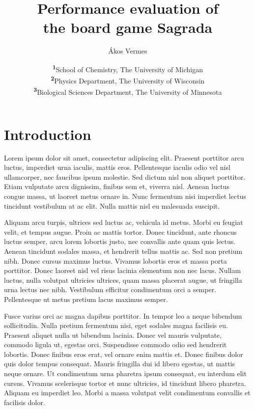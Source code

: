 \documentclass[
	a4paper, %
	10pt, %
	unnumberedsections, %
	twoside, %
]{LTJournalArticle}
\title{Performance evaluation of \\the board game Sagrada} %
\author{%
	Ákos Vermes
}
\date{\footnotesize\textsuperscript{\textbf{1}}School of Chemistry, The University of Michigan\\ \textsuperscript{\textbf{2}}Physics Department, The University of Wisconsin\\ \textsuperscript{\textbf{3}}Biological Sciences Department, The University of Minnesota}
\begin{document}
\maketitle %


\section{Introduction}

Lorem ipsum dolor sit amet, consectetur adipiscing elit. Praesent porttitor arcu luctus, imperdiet urna iaculis, mattis eros. Pellentesque iaculis odio vel nisl ullamcorper, nec faucibus ipsum molestie. Sed dictum nisl non aliquet porttitor. Etiam vulputate arcu dignissim, finibus sem et, viverra nisl. Aenean luctus congue massa, ut laoreet metus ornare in. Nunc fermentum nisi imperdiet lectus tincidunt vestibulum at ac elit. Nulla mattis nisl eu malesuada suscipit.

Aliquam arcu turpis, ultrices sed luctus ac, vehicula id metus. Morbi eu feugiat velit, et tempus augue. Proin ac mattis tortor. Donec tincidunt, ante rhoncus luctus semper, arcu lorem lobortis justo, nec convallis ante quam quis lectus. Aenean tincidunt sodales massa, et hendrerit tellus mattis ac. Sed non pretium nibh. Donec cursus maximus luctus. Vivamus lobortis eros et massa porta porttitor. Donec laoreet nisl vel risus lacinia elementum non nec lacus. Nullam luctus, nulla volutpat ultricies ultrices, quam massa placerat augue, ut fringilla urna lectus nec nibh. Vestibulum efficitur condimentum orci a semper. Pellentesque ut metus pretium lacus maximus semper.

Fusce varius orci ac magna dapibus porttitor. In tempor leo a neque bibendum sollicitudin. Nulla pretium fermentum nisi, eget sodales magna facilisis eu. Praesent aliquet nulla ut bibendum lacinia. Donec vel mauris vulputate, commodo ligula ut, egestas orci. Suspendisse commodo odio sed hendrerit lobortis. Donec finibus eros erat, vel ornare enim mattis et. Donec finibus dolor quis dolor tempus consequat. Mauris fringilla dui id libero egestas, ut mattis neque ornare. Ut condimentum urna pharetra ipsum consequat, eu interdum elit cursus. Vivamus scelerisque tortor et nunc ultricies, id tincidunt libero pharetra. Aliquam eu imperdiet leo. Morbi a massa volutpat velit condimentum convallis et facilisis dolor.
\end{document}
